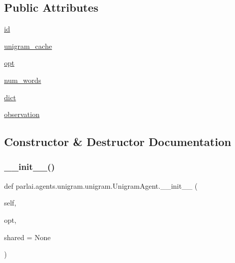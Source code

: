 \subsection*{Public Attributes}
\begin{DoxyCompactItemize}
\item 
\hyperlink{classparlai_1_1agents_1_1unigram_1_1unigram_1_1UnigramAgent_a574f4bdfd253231cd3ae54d9b9d3a6c3}{id}
\item 
\hyperlink{classparlai_1_1agents_1_1unigram_1_1unigram_1_1UnigramAgent_a18103467daa976a54a84feb931cdf2be}{unigram\+\_\+cache}
\item 
\hyperlink{classparlai_1_1agents_1_1unigram_1_1unigram_1_1UnigramAgent_abfbd6ca4f56545ac9c4514f38e65d1a2}{opt}
\item 
\hyperlink{classparlai_1_1agents_1_1unigram_1_1unigram_1_1UnigramAgent_a115f363de67abb097c3abf3ffe99a1da}{num\+\_\+words}
\item 
\hyperlink{classparlai_1_1agents_1_1unigram_1_1unigram_1_1UnigramAgent_a26ced196313bd88939a230881b857ff7}{dict}
\item 
\hyperlink{classparlai_1_1agents_1_1unigram_1_1unigram_1_1UnigramAgent_a590ee9adde9db2a7f65b28455e966a1b}{observation}
\end{DoxyCompactItemize}


\subsection{Constructor \& Destructor Documentation}
\mbox{\label{classparlai_1_1agents_1_1unigram_1_1unigram_1_1UnigramAgent_a8e406a0b849d5f823b66329c5285c29c}} 
\subsubsection{\texorpdfstring{\+\_\+\+\_\+init\+\_\+\+\_\+()}{\_\_init\_\_()}}
{\footnotesize\ttfamily def parlai.\+agents.\+unigram.\+unigram.\+Unigram\+Agent.\+\_\+\+\_\+init\+\_\+\+\_\+ (\begin{DoxyParamCaption}\item[{}]{self,  }\item[{}]{opt,  }\item[{}]{shared = {\ttfamily None} }\end{DoxyParamCaption})}

